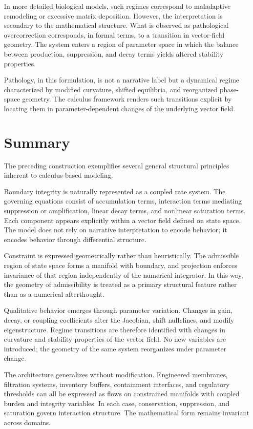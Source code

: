 \documentclass[12pt]{book}
\begin{document}
In more detailed biological models, such regimes correspond to
maladaptive remodeling or excessive matrix deposition. However, the
interpretation is secondary to the mathematical structure. What is
observed as pathological overcorrection corresponds, in formal terms,
to a transition in vector-field geometry. The system enters a region
of parameter space in which the balance between production, suppression,
and decay terms yields altered stability properties.

Pathology, in this formulation, is not a narrative label but a dynamical
regime characterized by modified curvature, shifted equilibria, and
reorganized phase-space geometry. The calculus framework renders such
transitions explicit by locating them in parameter-dependent changes of
the underlying vector field.

\section{Summary}

The preceding construction exemplifies several general structural
principles inherent to calculus-based modeling.

Boundary integrity is naturally represented as a coupled rate system.
The governing equations consist of accumulation terms, interaction
terms mediating suppression or amplification, linear decay terms, and
nonlinear saturation terms. Each component appears explicitly within
a vector field defined on state space. The model does not rely on
narrative interpretation to encode behavior; it encodes behavior
through differential structure.

Constraint is expressed geometrically rather than heuristically.
The admissible region of state space forms a manifold with boundary,
and projection enforces invariance of that region independently of the
numerical integrator. In this way, the geometry of admissibility is
treated as a primary structural feature rather than as a numerical
afterthought.

Qualitative behavior emerges through parameter variation.
Changes in gain, decay, or coupling coefficients alter the Jacobian,
shift nullclines, and modify eigenstructure. Regime transitions are
therefore identified with changes in curvature and stability properties
of the vector field. No new variables are introduced; the geometry of
the same system reorganizes under parameter change.

The architecture generalizes without modification.
Engineered membranes, filtration systems, inventory buffers,
containment interfaces, and regulatory thresholds can all be
expressed as flows on constrained manifolds with coupled burden
and integrity variables. In each case, conservation, suppression,
and saturation govern interaction structure. The mathematical form
remains invariant across domains.
\end{document}
